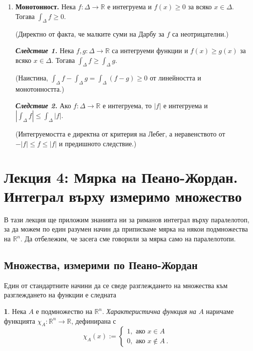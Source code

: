\documentclass[11pt]{article}
\numberwithin{equation}{section}
\numberwithin{figure}{section}
\numberwithin{table}{section}
\theoremstyle{plain}
\theoremstyle{definition}
\newtheorem{defn}[thm]{\protect\definitionname}
\theoremstyle{remark}
\theoremstyle{definition}
\theoremstyle{remark}
\theoremstyle{plain}
\theoremstyle{definition}
\theoremstyle{definition}
\theoremstyle{plain}
\theoremstyle{plain}
\theoremstyle{plain}
\theoremstyle{definition}
\theoremstyle{plain}
\providecommand{\definitionname}{Дефиниция}
\newcommand*{\R}{\mathbb{R}}
\begin{document}
\begin{enumerate}
\item \textbf{Монотонност.} Нека $f:\Delta\longrightarrow\R$ е интегруема и $f(x)\ge 0$ за всяко $x\in \Delta$. Тогава $\int_\Delta f \ge 0$.

    (Директно от факта, че малките суми на Дарбу за $f$ са неотрицателни.)

    \textbf{\textit{Следствие 1.}} Нека $f, g: \Delta \longrightarrow\R$ са интегруеми функции и $f(x)\ge g(x)$ за всяко $x\in \Delta$. Тогава $\int_\Delta f \ge \int_\Delta g$.

    (Наистина, $\int_\Delta f - \int_\Delta g=\int_\Delta (f -g) \ge 0$ от линейността и монотонността.)

\textbf{\textit{Следствие 2.}} Ако $f:\Delta\longrightarrow\R$ е интегруема, то $|f|$ е интегруема и $|\int_\Delta f|\le \int_\Delta |f|$.

(Интегруемостта е директна от критерия на Лебег, а неравенството от $-|f|\le f\le |f|$ и предишното следствие.)
\end{enumerate}

\newpage

\section{Лекция 4: Мярка на Пеано-Жордан. Интеграл върху измеримо множество}

В тази лекция ще приложим знанията ни за риманов интеграл върху паралелотоп, за да можем по един разумен начин да приписваме мярка на някои подмножества на $\R^n$. Да отбележим, че засега сме говорили за мярка само на паралелотопи.

\subsection{Множества, измерими по Пеано-Жордан}

Един от стандартните начини да се сведе разглеждането на множества към разглеждането на функции е следната

\begin{defn}
Нека $A$ е подмножество на $\R^n$. \textit{Характеристична функция на $A$} наричаме функцията $\chi_A :\R^n\longrightarrow \R$, дефинирана с
$$\chi_A (x):=\left\{ \begin{array}{l} 1, \mbox{ ако } x\in A \\ 0, \mbox{ ако } x\not \in A \ .\end{array}\right.$$
\end{defn}
\end{document}
